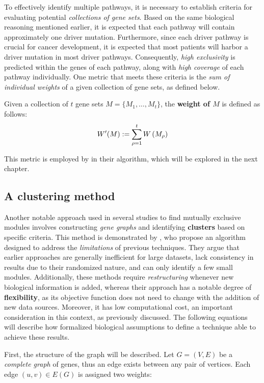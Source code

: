 To effectively identify multiple pathways, it is necessary to establish criteria for evaluating potential \textit{collections of gene sets}. Based on the same biological reasoning mentioned earlier, it is expected that each pathway will contain approximately one driver mutation. Furthermore, since each driver pathway is crucial for cancer development, it is expected that most patients will harbor a driver mutation in most driver pathways. Consequently, \textit{high exclusivity} is predicted within the genes of each pathway, along with \textit{high coverage} of each pathway individually. One metric that meets these criteria is the \textit{sum of individual weights} of a given collection of gene sets, as defined below.

\begin{definition}
    Given a collection of $t$ gene sets $M = \{ M_1, \ldots, M_t \}$, the \textbf{weight of $M$} is defined as follows: $$W'(M) := \sum_{\rho = 1}^t{W \left(M_\rho\right)}$$
\end{definition}

This metric is employed by \textcite{multi-dendrix} in their algorithm, which will be explored in the next chapter.

\subsection{A clustering method} \label{c3_chap2}

Another notable approach used in several studies to find mutually exclusive modules involves constructing \textit{gene graphs} and identifying \textbf{clusters} based on specific criteria. This method is demonstrated by \textcite{c3}, who propose an algorithm designed to address the \textit{limitations} of previous techniques. They argue that earlier approaches are generally inefficient for large datasets, lack consistency in results due to their randomized nature, and can only identify a few small modules. Additionally, these methods require \textit{restructuring} whenever new biological information is added, whereas their approach has a notable degree of \textbf{flexibility}, as its objective function does not need to change with the addition of new data sources. Moreover, it has low computational cost, an important consideration in this context, as previously discussed. The following equations will describe how \textcite{c3} formalized biological assumptions to define a technique able to achieve these results.

First, the structure of the graph will be described. Let $G = (V, E)$ be a \textit{complete graph} of genes, thus an edge exists between any pair of vertices. Each edge $(u, v) \in E(G)$ is assigned two weights:

